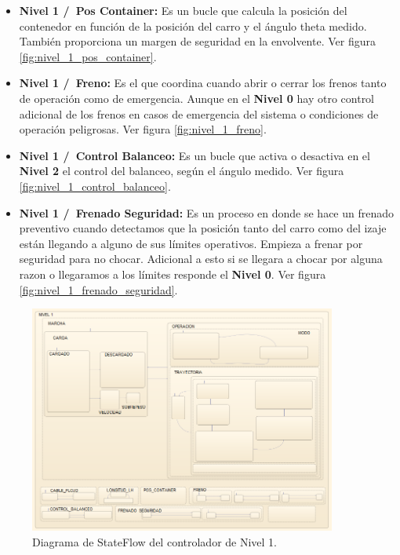 \documentclass[11pt]{article}
\begin{document}
\begin{itemize}
	\item \textbf{Nivel 1 /\ Pos Container:} Es un bucle que calcula la posición del contenedor en función de la posición del carro y el ángulo theta medido. También proporciona un margen de seguridad en la envolvente. Ver figura \ref{fig:nivel_1_pos_container}.
	
	\item \textbf{Nivel 1 /\ Freno:} Es el que coordina cuando abrir o cerrar los frenos tanto de operación como de emergencia. Aunque en el \textbf{Nivel 0} hay otro control adicional de los frenos en casos de emergencia del sistema o condiciones de operación peligrosas. Ver figura \ref{fig:nivel_1_freno}.
	
	\item \textbf{Nivel 1 /\ Control Balanceo:} Es un bucle que activa o desactiva en el \textbf{Nivel 2} el control del balanceo, según el ángulo medido. Ver figura \ref{fig:nivel_1_control_balanceo}.
	
	\item \textbf{Nivel 1 /\ Frenado Seguridad:} Es un proceso en donde se hace un frenado preventivo cuando detectamos que la posición tanto del carro como del izaje están llegando a alguno de sus límites operativos. Empieza a frenar por seguridad para no chocar. Adicional a esto si se llegara a chocar por alguna razon o llegaramos a los límites responde el \textbf{Nivel 0}. Ver figura \ref{fig:nivel_1_frenado_seguridad}.
	
\end{itemize}

\begin{figure}[!h]
	\centering
	\includegraphics[width=0.9\textwidth]{images/imagen_16_automa_nivel_1.png}
	\caption{Diagrama de StateFlow del controlador de Nivel 1.}
	\label{fig:nivel_1}
\end{figure}
\end{document}
